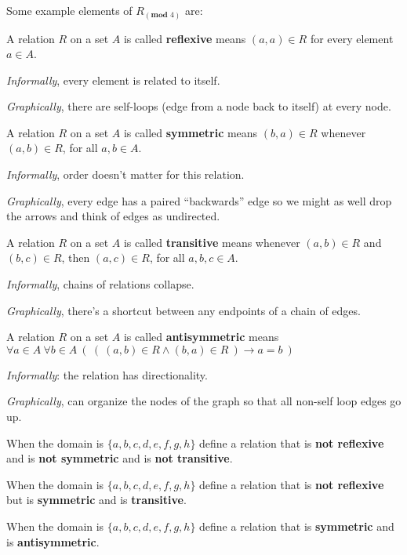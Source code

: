 \documentclass[12pt, oneside]{article}
\begin{document}
Some example elements of $R_{(\textbf{mod } 4)}$ are: 

\vspace{50pt} \newpage


A relation $R$ on a set $A$ is called {\bf reflexive} 
means $(a, a) \in R$ for every element $a \in A$. 
 

{\it Informally}, every element is related to itself.

{\it Graphically}, there are self-loops (edge from a node back to itself) at 
every node. \vfill


A relation $R$ on a set $A$ is called {\bf symmetric} means 
$(b, a) \in R$ whenever $(a, b) \in R$, for all $a, b \in A$. 
 

{\it Informally}, order doesn't matter for this relation.

{\it Graphically}, every edge has a paired ``backwards'' edge so we might
as well drop the arrows and think of edges as undirected. \vfill


A relation $R$ on a set $A$ is called {\bf transitive} means 
whenever $(a, b) \in R$ and $(b, c) \in R$, then $(a, c) \in R$, for all $a, b, c \in A$.
 

{\it Informally}, chains of relations collapse.

{\it Graphically}, there's a shortcut between any endpoints of a chain of 
edges. \vfill


A relation $R$ on a set $A$ is called {\bf antisymmetric} means 
$\forall a \in A ~\forall b \in A~\left(~\left( ~(a,b) \in R \land (b,a) \in R ~\right) \to a=b~\right)$
 

{\it Informally}: the relation has directionality.

{\it Graphically}, can organize the nodes of the graph so that 
all non-self loop edges go up. \vfill
\newpage



When the domain is $\{ a,b,c,d,e,f,g,h\}$ define a relation that is {\bf not reflexive} and 
is {\bf not symmetric} and is {\bf not transitive}.

\vspace{80pt}

When the domain is $\{ a,b,c,d,e,f,g,h\}$ define a relation that is {\bf not reflexive} but 
is {\bf symmetric} and is {\bf transitive}.

\vspace{80pt}


When the domain is $\{ a,b,c,d,e,f,g,h\}$ define a relation that is {\bf symmetric} and
is {\bf antisymmetric}.
\end{document}
